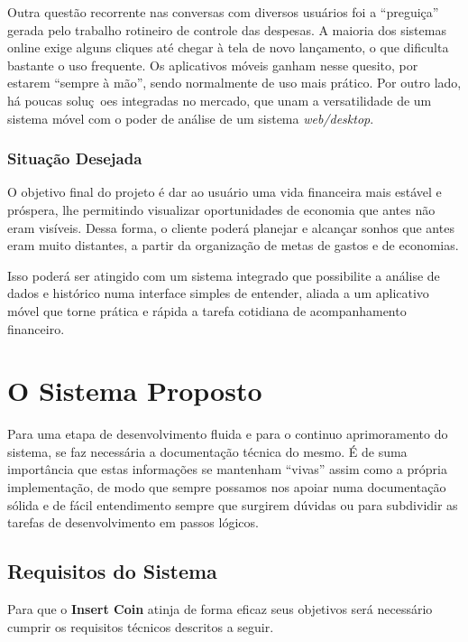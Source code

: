\documentclass[a4paper]{abnt}
\begin{document}
Outra quest\~ao recorrente nas conversas com diversos usuários foi a ``preguiça'' gerada pelo trabalho rotineiro de controle das despesas. A maioria dos sistemas online exige alguns cliques até chegar à tela de novo lançamento, o que dificulta bastante o uso frequente. Os aplicativos móveis ganham nesse quesito, por estarem ``sempre \`a m\~ao'', sendo normalmente de uso mais pr\'atico. Por outro lado, h\'a poucas soluç~oes integradas no mercado, que unam a versatilidade de um sistema móvel com o poder de análise de um sistema \emph{web/desktop}.

\subsection{Situação Desejada}
O objetivo final do projeto é dar ao usuário uma vida financeira mais estável e próspera, lhe permitindo visualizar oportunidades de economia que antes não eram visíveis. Dessa forma, o cliente poderá planejar e alcançar sonhos que antes eram muito distantes, a partir da organização de metas de gastos e de economias. 

Isso poderá ser atingido com um sistema integrado que possibilite a análise de dados e histórico numa interface simples de entender, aliada a um aplicativo móvel que torne prática e rápida a tarefa cotidiana de acompanhamento financeiro. 

\chapter{O Sistema Proposto}
Para uma etapa de desenvolvimento fluida e para o continuo aprimoramento do sistema, se faz necessária a documentação técnica do mesmo. É de suma importância que estas informações se mantenham ``vivas'' assim como a própria implementação, de modo que sempre possamos nos apoiar numa documentação sólida e de fácil entendimento sempre que surgirem dúvidas ou para subdividir as tarefas de desenvolvimento em passos lógicos. 

\section{Requisitos do Sistema}
Para que o \textbf{Insert Coin} atinja de forma eficaz seus objetivos será necessário cumprir os requisitos técnicos descritos a seguir. 
\end{document}
